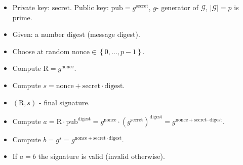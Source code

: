 \begin{frame}
\begin{emptyTheorem}
\begin{itemize}
\item Private key: $\mathrm{secret}$. Public key: $\mathrm{pub} = g^{\mathrm{secret}}$, $g$- generator of $\mathcal G$, $|\mathcal G|= p$ is prime. 
\end{itemize}
\end{emptyTheorem}
\begin{emptyTheorem}
\begin{itemize}
\item Given: a number $\mathrm{digest}$ (message digest). 
\item Choose at random $\mathrm{nonce} \in \left\{0,\dots, p-1\right\}$.
\item Compute $\mathrm{R} = g^{\mathrm{nonce}}$.
\item Compute $s = \mathrm{nonce} +  \mathrm{secret}\cdot \mathrm{digest} $.
\item $(\mathrm{R},s)$ - final signature.
\end{itemize}
\end{emptyTheorem}
\begin{emptyTheorem}
\begin{itemize} 
\item Compute $a=\mathrm{R} \cdot \mathrm{pub}^{\mathrm{digest}} = g^{\mathrm{nonce}} \cdot \left(g^{\mathrm{secret}}\right)^{\mathrm{digest}} = g^{\mathrm{nonce} + \mathrm{secret}\cdot \mathrm{digest}} $.
\item Compute $b=g^{s} = g^{\mathrm{nonce} + \mathrm{secret}\cdot \mathrm{digest}}$.
\item If $a= b$ the signature is valid (invalid otherwise).
\end{itemize}
\end{emptyTheorem}
\end{frame}
